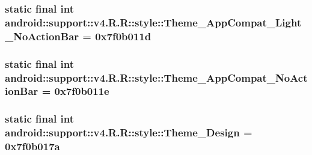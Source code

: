 \hypertarget{classandroid_1_1support_1_1v4_1_1_r_1_1style_445f78330bfee903af7e0583c99217ce}{
\subsubsection[{Theme\_\-AppCompat\_\-Light\_\-NoActionBar}]{\setlength{\rightskip}{0pt plus 5cm}static final int android::support::v4.R.R::style::Theme\_\-AppCompat\_\-Light\_\-NoActionBar = 0x7f0b011d}}
\label{classandroid_1_1support_1_1v4_1_1_r_1_1style_445f78330bfee903af7e0583c99217ce}


\hypertarget{classandroid_1_1support_1_1v4_1_1_r_1_1style_edb7f5bb3e489efea13ecbe76e138637}{
\subsubsection[{Theme\_\-AppCompat\_\-NoActionBar}]{\setlength{\rightskip}{0pt plus 5cm}static final int android::support::v4.R.R::style::Theme\_\-AppCompat\_\-NoActionBar = 0x7f0b011e}}
\label{classandroid_1_1support_1_1v4_1_1_r_1_1style_edb7f5bb3e489efea13ecbe76e138637}


\hypertarget{classandroid_1_1support_1_1v4_1_1_r_1_1style_0fde6623e5776df63c985a1486992d5e}{
\subsubsection[{Theme\_\-Design}]{\setlength{\rightskip}{0pt plus 5cm}static final int android::support::v4.R.R::style::Theme\_\-Design = 0x7f0b017a}}
\label{classandroid_1_1support_1_1v4_1_1_r_1_1style_0fde6623e5776df63c985a1486992d5e}


